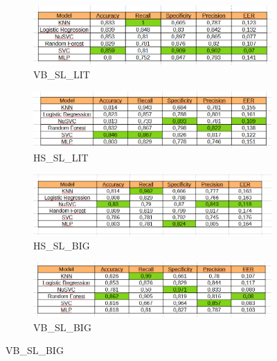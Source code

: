 \documentclass{article}
\begin{document}
\begin{figure}[H]
    \centering
    \begin{subfigure}[b]{0.65\textwidth}
        \includegraphics[width=\linewidth]{Images/Results/Verification_single/st/VB_SL_LIT.png}
        \caption{VB\_SL\_LIT}
    \end{subfigure}
    \begin{subfigure}[b]{0.65\textwidth}
        \includegraphics[width=\linewidth]{Images/Results/Verification_single/st/HS_SL_LIT.png}
        \caption{HS\_SL\_LIT}
    \end{subfigure}

    \begin{subfigure}[b]{0.65\textwidth}
        \includegraphics[width=\linewidth]{Images/Results/Verification_single/st/HS_SL_BIG.png}
        \caption{HS\_SL\_BIG}
    \end{subfigure}
    \begin{subfigure}[b]{0.65\textwidth}
        \includegraphics[width=\linewidth]{Images/Results/Verification_single/st/VB_SL_BIG.png}
        \caption{VB\_SL\_BIG}
    \end{subfigure}


\end{figure}
\end{document}
